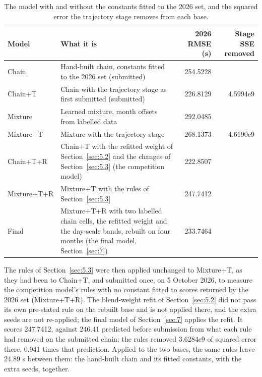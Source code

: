 \documentclass[
  manuscript=article,
  layout=preprint,
  year=2026,
  volume=x,
]{extra/joas}
\begin{document}
\begin{table}[htbp!]
  \centering
  \small
  \setlength{\tabcolsep}{5pt}\renewcommand{\arraystretch}{1.15}
  \caption{The model with and without the constants fitted to the 2026 set, and the squared error the trajectory stage removes from each base.}
  \label{tab:16}
  \begin{tabularx}{\linewidth}{l>{\raggedright\arraybackslash}Xrr}
  \toprule
  \textbf{Model} & \textbf{What it is} & \textbf{2026 RMSE (s)} & \textbf{Stage SSE removed} \\
  \midrule
  Chain & Hand-built chain, constants fitted to the 2026 set (submitted) & 254.5228 &  \\
  Chain+T & Chain with the trajectory stage as first submitted (submitted) & 226.8129 & 4.5994e9 \\
  Mixture & Learned mixture, month offsets from labelled data & 292.0485 &  \\
  Mixture+T & Mixture with the trajectory stage & 268.1373 & 4.6190e9 \\
  Chain+T+R & Chain+T with the refitted weight of Section~\ref{sec:5.2} and the changes of Section~\ref{sec:5.3} (the competition model) & 222.8507 &  \\
  Mixture+T+R & Mixture+T with the rules of Section~\ref{sec:5.3} & 247.7412 &  \\
  Final & Mixture+T+R with two labelled chain cells, the refitted weight and the day-scale bands, rebuilt on four months (the final model, Section~\ref{sec:7}) & 233.7464 &  \\
  \bottomrule
  \end{tabularx}
\end{table}

The rules of Section~\ref{sec:5.3} were then applied unchanged to Mixture+T, as they had been to Chain+T, and submitted once, on 5 October 2026, to measure the competition model's rules with no constant fitted to scores returned by the 2026 set (Mixture+T+R). The blend-weight refit of Section~\ref{sec:5.2} did not pass its own pre-stated rule on the rebuilt base and is not applied there, and the extra seeds are not re-applied; the final model of Section~\ref{sec:7} applies the refit. It scores 247.7412, against 246.41 predicted before submission from what each rule had removed on the submitted chain; the rules removed 3.6284e9 of squared error there, 0.941 times that prediction. Applied to the two bases, the same rules leave 24.89 s between them: the hand-built chain and its fitted constants, with the extra seeds, together.
\end{document}
